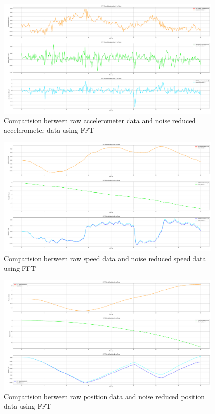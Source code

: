 \documentclass{article}
\begin{document}
    \FloatBarrier
    \begin{figure}[ht]
        \centering
        \includegraphics[width=\textwidth]{2_1_9_1.png}
        \caption{Comparision between raw accelerometer data and noise reduced
        accelerometer data using FFT}
        \label{fig:accel_fft}
    \end{figure}
    \FloatBarrier
    \begin{figure}[ht]
        \centering
        \includegraphics[width=\textwidth]{2_1_9_2.png}
        \caption{Comparision between raw speed data and noise reduced speed data
        using FFT}
        \label{fig:speed_fft}
    \end{figure}
    \FloatBarrier
    \begin{figure}[ht]
        \centering
        \includegraphics[width=\textwidth]{2_1_9_3.png}
        \caption{Comparision between raw position data and noise reduced
        position data using FFT}
        \label{fig:position_fft}
    \end{figure}
\end{document}
